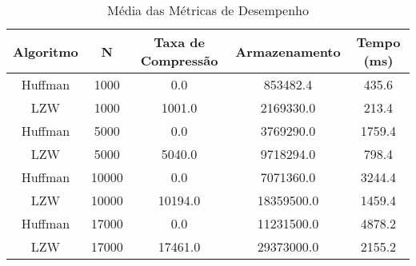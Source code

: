 \begin{table}[H]
\caption{Média das Métricas de Desempenho}
\label{tab:compressao}
\begin{tabular}{c|c|c|c|c}
\textbf{Algoritmo} &\textbf{N} & \textbf{Taxa de Compressão} & \textbf{Armazenamento} & \textbf{Tempo (ms)}\\
\hline
Huffman & 1000 & 0.0 & 853482.4 & 435.6\\
LZW & 1000 & 1001.0 & 2169330.0 & 213.4\\
Huffman & 5000 & 0.0 & 3769290.0 & 1759.4\\
LZW & 5000 & 5040.0 & 9718294.0 & 798.4\\
Huffman & 10000 & 0.0 & 7071360.0 & 3244.4\\
LZW & 10000 & 10194.0 & 18359500.0 & 1459.4\\
Huffman & 17000 & 0.0 & 11231500.0 & 4878.2\\
LZW & 17000 & 17461.0 & 29373000.0 & 2155.2\\
\end{tabular}
\end{table}
